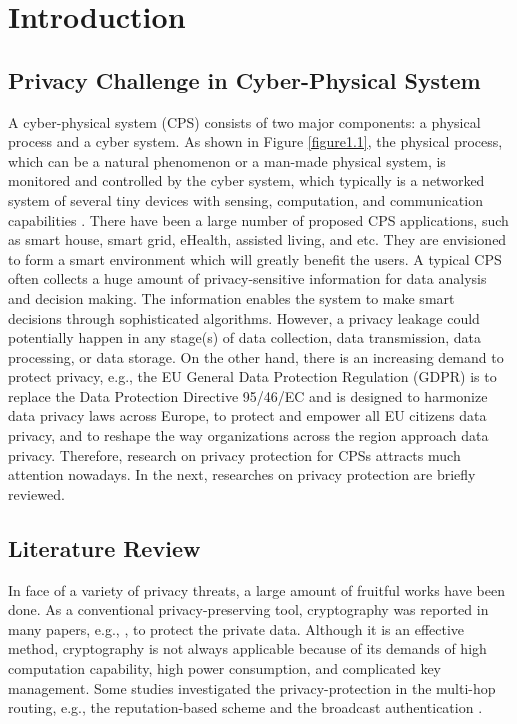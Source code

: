 \chapter{Introduction}
\label{chapter1}

\section{Privacy Challenge in Cyber-Physical System}
\label{section1.1}
A cyber-physical system (CPS) consists of two major components: a physical process and a cyber system. As shown in Figure \ref{figure1.1}, the physical process, which can be a natural phenomenon or a man-made physical system, is monitored and controlled by the cyber system, which typically is a networked system of several tiny devices with sensing, computation, and communication capabilities \cite{eric2010}. There have been a large number of proposed CPS applications, such as smart house, smart grid, eHealth, assisted living, and etc. They are envisioned to form a smart environment which will greatly benefit the users. A typical CPS often collects a huge amount of privacy-sensitive information for data analysis and decision making. The information enables the system to make smart decisions through sophisticated algorithms. However, a privacy leakage could potentially happen in any stage(s) of data collection, data transmission, data processing, or data storage. On the other hand, there is an increasing demand to protect privacy, e.g., the EU General Data Protection Regulation (GDPR) \cite{gdpr} is to replace the Data Protection Directive 95/46/EC and is designed to harmonize data privacy laws across Europe, to protect and empower all EU citizens data privacy, and to reshape the way organizations across the region approach data privacy. Therefore, research on privacy protection for CPSs attracts much attention nowadays. In the next, researches on privacy protection are briefly reviewed.

\section{Literature Review}
\label{section1.2}
In face of a variety of privacy threats, a large amount of fruitful works have been done. As a conventional privacy-preserving tool, cryptography was reported in many papers, e.g., \cite{stefan2005}, to protect the private data. Although it is an effective method, cryptography is not always applicable because of its demands of high computation capability, high power consumption, and complicated key management. Some studies investigated the privacy-protection in the multi-hop routing, e.g., the reputation-based scheme \cite{cao2006} and the broadcast authentication \cite{liu2005}.


